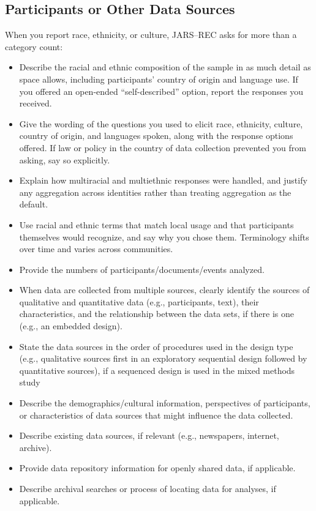 \documentclass[acmsmall,screen,anonymous,review]{acmart}
\begin{document}
\subsection{Participants or Other Data Sources}


When you report race, ethnicity, or culture, JARS--REC asks for more than a category count:
\begin{itemize}
    \item Describe the racial and ethnic composition of the sample in as much detail as space allows, including participants' country of origin and language use. If you offered an open-ended ``self-described'' option, report the responses you received.
    \item Give the wording of the questions you used to elicit race, ethnicity, culture, country of origin, and languages spoken, along with the response options offered. If law or policy in the country of data collection prevented you from asking, say so explicitly.
    \item Explain how multiracial and multiethnic responses were handled, and justify any aggregation across identities rather than treating aggregation as the default.
    \item Use racial and ethnic terms that match local usage and that participants themselves would recognize, and say why you chose them. Terminology shifts over time and varies across communities.
\end{itemize}

\begin{itemize}
\item Provide the numbers of participants/documents/events analyzed.
\item When data are collected from multiple sources, clearly identify the sources of qualitative and quantitative data (e.g., participants, text), their characteristics, and the relationship between the data sets, if there is one (e.g., an embedded design).
\item State the data sources in the order of procedures used in the design type (e.g., qualitative sources first in an exploratory sequential design followed by quantitative sources), if a sequenced design is used in the mixed methods study
\item Describe the demographics/cultural information, perspectives of participants, or characteristics of data sources that might influence the data collected.
\item Describe existing data sources, if relevant (e.g., newspapers, internet, archive). 
\item Provide data repository information for openly shared data, if applicable. 
\item Describe archival searches or process of locating data for analyses, if applicable.
\end{itemize}
\end{document}
